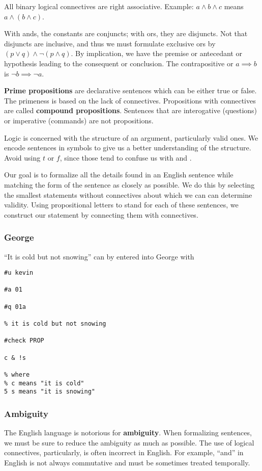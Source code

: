 \documentclass[12pt]{article}
\begin{document}
All binary logical connectives are right associative. Example: $a \land b \land c$ means $a \land (b \land c)$.

With ands, the constants are conjuncts; with ors, they are disjuncts. Not that disjuncts are inclusive, and thus we must formulate exclusive ors by $(p \lor q) \land \neg (p \land q)$. By implication, we have the premise or antecedant or hypothesis leading to the consequent or conclusion. The contrapositive or $a \implies b$ is $\neg b \implies \neg a$.

{\bf Prime propositions} are declarative sentences which can be either true or false. The primeness is based on the lack of connectives. Propositions with connectives are called {\bf compound propositions}. Sentences that are interogative (questions) or imperative (commands) are not propositions.

Logic is concerned with the structure of an argument, particularly valid ones. We encode sentences in symbols to give us a better understanding of the structure. Avoid using $t$ or $f$, since those tend to confuse us with \true and \false .

Our goal is to formalize all the details found in an English sentence while matching the form of the sentence as closely as possible. We do this by selecting the smallest statements without connectives about which we can can determine validity. Using propositional letters to stand for each of these sentences, we construct our statement by connecting them with connectives.

\subsubsection*{George}
``It is cold but not snowing'' can by entered into George with

\begin{verbatim}
#u kevin

#a 01

#q 01a

% it is cold but not snowing

#check PROP

c & !s

% where
% c means "it is cold"
5 s means "it is snowing"
\end{verbatim}

\subsubsection*{Ambiguity}
The English language is notorious for {\bf ambiguity}. When formalizing sentences, we must be sure to reduce the ambiguity as much as possible. The use of logical connectives, particularly, is often incorrect in English. For example, ``and'' in English is not always commutative and must be sometimes treated temporally.
\end{document}
